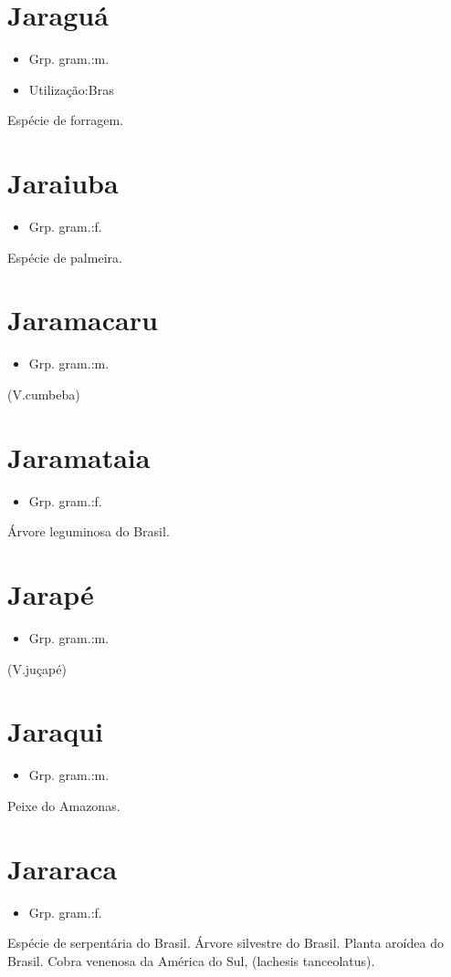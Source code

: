 \documentclass{article}
\begin{document}
\section{Jaraguá}
\begin{itemize}
\item {Grp. gram.:m.}
\end{itemize}
\begin{itemize}
\item {Utilização:Bras}
\end{itemize}
Espécie de forragem.
\section{Jaraiuba}
\begin{itemize}
\item {Grp. gram.:f.}
\end{itemize}
Espécie de palmeira.
\section{Jaramacaru}
\begin{itemize}
\item {Grp. gram.:m.}
\end{itemize}
(V.cumbeba)
\section{Jaramataia}
\begin{itemize}
\item {Grp. gram.:f.}
\end{itemize}
Árvore leguminosa do Brasil.
\section{Jarapé}
\begin{itemize}
\item {Grp. gram.:m.}
\end{itemize}
(V.juçapé)
\section{Jaraqui}
\begin{itemize}
\item {Grp. gram.:m.}
\end{itemize}
Peixe do Amazonas.
\section{Jararaca}
\begin{itemize}
\item {Grp. gram.:f.}
\end{itemize}
Espécie de serpentária do Brasil.
Árvore silvestre do Brasil.
Planta aroídea do Brasil.
Cobra venenosa da América do Sul, (\textunderscore lachesis tanceolatus\textunderscore ).
\end{document}
